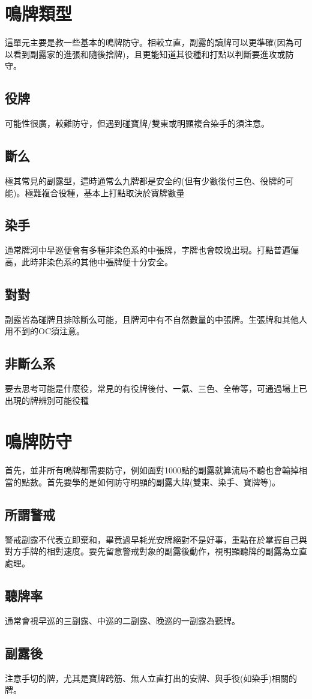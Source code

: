 \documentclass[a4paper,12pt]{article}
\begin{document}
\section{鳴牌類型}
這單元主要是教一些基本的鳴牌防守。相較立直，副露的讀牌可以更準確(因為可以看到副露家的進張和隨後捨牌)，且更能知道其役種和打點以判斷要進攻或防守。
\subsection{役牌}
可能性很廣，較難防守，但遇到碰寶牌/雙東或明顯複合染手的須注意。
\subsection{斷么}
極其常見的副露型，這時通常么九牌都是安全的(但有少數後付三色、役牌的可能)。極難複合役種，基本上打點取決於寶牌數量
\subsection{染手}
通常牌河中早巡便會有多種非染色系的中張牌，字牌也會較晚出現。打點普遍偏高，此時非染色系的其他中張牌便十分安全。
\subsection{對對}
副露皆為碰牌且排除斷么可能，且牌河中有不自然數量的中張牌。生張牌和其他人用不到的OC須注意。
\subsection{非斷么系}
要去思考可能是什麼役，常見的有役牌後付、一氣、三色、全帶等，可通過場上已出現的牌辨別可能役種
\section{鳴牌防守}
首先，並非所有鳴牌都需要防守，例如面對1000點的副露就算流局不聽也會輸掉相當的點數。首先要學的是如何防守明顯的副露大牌(雙東、染手、寶牌等)。
\subsection{所謂警戒}
警戒副露不代表立即棄和，畢竟過早耗光安牌絕對不是好事，重點在於掌握自己與對方手牌的相對速度。要先留意警戒對象的副露後動作，視明顯聽牌的副露為立直處理。
\subsection{聽牌率}
通常會視早巡的三副露、中巡的二副露、晚巡的一副露為聽牌。
\subsection{副露後}
注意手切的牌，尤其是寶牌跨筋、無人立直打出的安牌、與手役(如染手)相關的牌。
\end{document}
